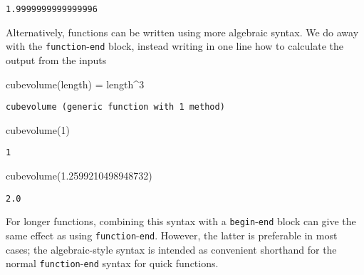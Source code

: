 \documentclass[
  letterpaper,
  DIV=11,
  numbers=noendperiod]{scrreprt}
\newenvironment{Shaded}{\begin{snugshade}}{\end{snugshade}}
\newcommand{\FloatTok}[1]{\textcolor[rgb]{0.68,0.00,0.00}{#1}}
\newcommand{\FunctionTok}[1]{\textcolor[rgb]{0.28,0.35,0.67}{#1}}
\newcommand{\NormalTok}[1]{\textcolor[rgb]{0.00,0.23,0.31}{#1}}
\newcommand{\OperatorTok}[1]{\textcolor[rgb]{0.37,0.37,0.37}{#1}}
\begin{document}
\begin{verbatim}
1.9999999999999996
\end{verbatim}

Alternatively, functions can be written using more algebraic syntax. We
do away with the \texttt{function}-\texttt{end} block, instead writing
in one line how to calculate the output from the inputs

\begin{Shaded}
\begin{Highlighting}[]
\FunctionTok{cubevolume}\NormalTok{(length) }\OperatorTok{=}\NormalTok{ length}\OperatorTok{\^{}}\FloatTok{3}
\end{Highlighting}
\end{Shaded}

\begin{verbatim}
cubevolume (generic function with 1 method)
\end{verbatim}

\begin{Shaded}
\begin{Highlighting}[]
\FunctionTok{cubevolume}\NormalTok{(}\FloatTok{1}\NormalTok{)}
\end{Highlighting}
\end{Shaded}

\begin{verbatim}
1
\end{verbatim}

\begin{Shaded}
\begin{Highlighting}[]
\FunctionTok{cubevolume}\NormalTok{(}\FloatTok{1.2599210498948732}\NormalTok{)}
\end{Highlighting}
\end{Shaded}

\begin{verbatim}
2.0
\end{verbatim}

\begin{tcolorbox}[enhanced jigsaw, toprule=.15mm, opacitybacktitle=0.6, leftrule=.75mm, breakable, coltitle=black, bottomrule=.15mm, colbacktitle=quarto-callout-tip-color!10!white, bottomtitle=1mm, rightrule=.15mm, title=\textcolor{quarto-callout-tip-color}{\faLightbulb}\hspace{0.5em}{Convention}, colframe=quarto-callout-tip-color-frame, left=2mm, colback=white, opacityback=0, arc=.35mm, toptitle=1mm, titlerule=0mm]

For longer functions, combining this syntax with a
\texttt{begin}-\texttt{end} block can give the same effect as using
\texttt{function}-\texttt{end}. However, the latter is preferable in
most cases; the algebraic-style syntax is intended as convenient
shorthand for the normal \texttt{function}-\texttt{end} syntax for quick
functions.

\end{tcolorbox}
\end{document}
